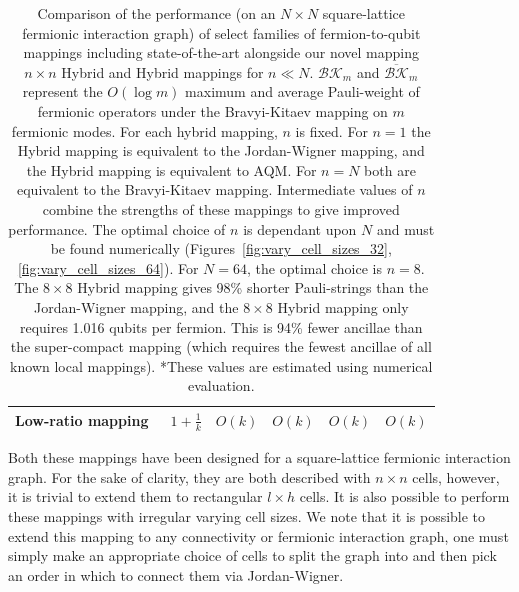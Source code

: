 \begin{table}
\begin{tabular}{k{6em} k{4.3em} k{4.5em} k{4.6em} k{5em} k{4.6em}}
        Low-ratio mapping~\cite{chen2022equivalence,steudtner2019quantum}&$1+\frac{1}{k}$&$O(k)$&$O(k)$&$O(k)$& $O(k)$\\ \hline
    \end{tabular}
    \caption{\label{tab:performance} { Comparison of the performance (on an $N \times N$ square-lattice fermionic interaction graph) of select families of fermion-to-qubit mappings including state-of-the-art alongside our novel mapping $n\times n$ Hybrid and Hybrid\+ mappings for $n \ll N$.  $\mathcal{BK}_m$ and $\overline{\mathcal{BK}}_m$ represent the $O(\log m)$ maximum and average Pauli-weight of fermionic operators under the Bravyi-Kitaev mapping on $m$ fermionic modes. For each hybrid mapping, $n$ is fixed. For $n=1$ the Hybrid mapping is equivalent to the Jordan-Wigner mapping, and the Hybrid\+ mapping is equivalent to AQM. For $n=N$ both are equivalent to the Bravyi-Kitaev mapping. Intermediate values of $n$ combine the strengths of these mappings to give improved performance. The optimal choice of $n$ is dependant upon $N$ and must be found numerically (Figures~\ref{fig:vary_cell_sizes_32},\ref{fig:vary_cell_sizes_64}). For $N=64$, the optimal choice is $n=8$. The $8 \times 8$ Hybrid mapping gives 98\% shorter Pauli-strings than the Jordan-Wigner mapping, and the $8 \times 8$ Hybrid\+ mapping only requires 1.016 qubits per fermion. This is 94\% fewer ancillae than the super-compact mapping (which requires the fewest ancillae of all known local mappings). *These values are estimated using numerical evaluation.} } 
\end{table}

Both these mappings have been designed for a square-lattice fermionic interaction graph. For the sake of clarity, they are both described with $n \times n$ cells, however, it is trivial to extend them to rectangular $l \times h$ cells. It is also possible to perform these mappings with irregular varying cell sizes. We note that it is possible to extend this mapping to any connectivity or fermionic interaction graph, one must simply make an appropriate choice of cells to split the graph into and then pick an order in which to connect them via Jordan-Wigner.
